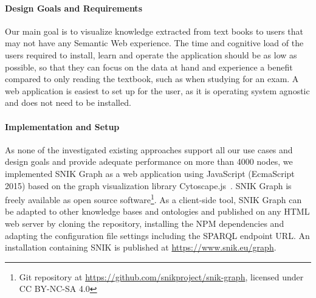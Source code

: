 \documentclass[conference]{IEEEtran}
\begin{document}
\paragraph{Design Goals and Requirements}
Our main goal is to visualize knowledge extracted from text books to users that may not have any Semantic Web experience.
The time and cognitive load of the users required to install, learn and operate the application should be as low as possible, so that they can focus on the data at hand and experience a benefit compared to only reading the textbook, such as when studying for an exam.
A web application is easiest to set up for the user, as it is operating system agnostic and does not need to be installed.

\paragraph{Implementation and Setup}
As none of the investigated existing approaches support all our use cases and design goals and provide adequate performance on more than 4000 nodes, we implemented SNIK Graph as a web application using JavaScript (EcmaScript 2015) based on the graph visualization library Cytoscape.js~\cite{cytoscape}.
SNIK Graph is freely available as open source software\footnote{Git repository at \url{https://github.com/snikproject/snik-graph}, licensed under CC BY-NC-SA 4.0}.
As a client-side tool\footnotemark{}, SNIK Graph can be adapted to other knowledge bases and ontologies and published on any HTML web server by cloning the repository, installing the NPM dependencies and adapting the configuration file settings including the SPARQL endpoint URL.
%
An installation containing SNIK is published at \url{https://www.snik.eu/graph}.

\end{document}
